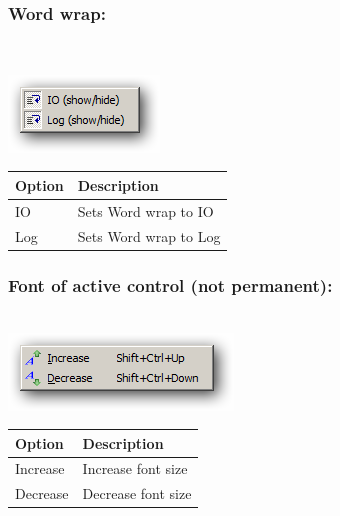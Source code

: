 \hypertarget{menu_view_r_rterm_wordwrap}{}
\subsubsection{Word wrap:}\\

\includegraphics[scale=0.50]{./res/menu_r_rterm_wordwrap.png}\\

\begin{scriptsize}\begin{tabularx}{\textwidth}{>{\hsize=0.3\hsize}X>{\hsize=0.7\hsize}X}\\
    \hline
    \textbf{Option} & \textbf{Description} \\
    \hline
    IO & Sets Word wrap to IO \\
    Log & Sets Word wrap to Log \\
    \hline
  \end{tabularx}\end{scriptsize}


\hypertarget{menu_r_rterm_fontsize}{}
\subsubsection{Font of active control (not permanent):}\\

\includegraphics[scale=0.50]{./res/menu_fontsize_generic.png}\\

\begin{scriptsize}\begin{tabularx}{\textwidth}{>{\hsize=0.3\hsize}X>{\hsize=0.7\hsize}X}\\
    \hline
    \textbf{Option} & \textbf{Description} \\
    \hline
    Increase & Increase font size \\
    Decrease & Decrease font size \\
    \hline
  \end{tabularx}\end{scriptsize}


